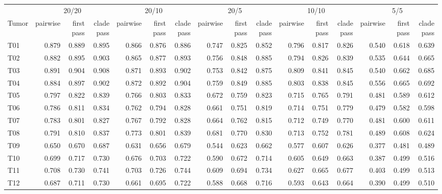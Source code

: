 \begin{tabular}{lrrrrrrrrrrrrrrr}
\toprule
 & \multicolumn{3}{c}{20/20} & \multicolumn{3}{c}{20/10} & \multicolumn{3}{c}{20/5} & \multicolumn{3}{c}{10/10} & \multicolumn{3}{c}{5/5} \\
\cmidrule(lr){2-4}\cmidrule(lr){5-7}\cmidrule(lr){8-10}\cmidrule(lr){11-13}\cmidrule(lr){14-16}
Tumor & pairwise & first pass & clade pass & pairwise & first pass & clade pass & pairwise & first pass & clade pass & pairwise & first pass & clade pass & pairwise & first pass & clade pass \\
\midrule
T01 & 0.879 & 0.889 & 0.895 & 0.866 & 0.876 & 0.886 & 0.747 & 0.825 & 0.852 & 0.796 & 0.817 & 0.826 & 0.540 & 0.618 & 0.639 \\
T02 & 0.882 & 0.895 & 0.903 & 0.865 & 0.877 & 0.893 & 0.756 & 0.848 & 0.885 & 0.794 & 0.826 & 0.839 & 0.535 & 0.644 & 0.665 \\
T03 & 0.891 & 0.904 & 0.908 & 0.871 & 0.893 & 0.902 & 0.753 & 0.842 & 0.875 & 0.809 & 0.841 & 0.845 & 0.540 & 0.662 & 0.685 \\
T04 & 0.884 & 0.897 & 0.902 & 0.872 & 0.892 & 0.904 & 0.759 & 0.849 & 0.885 & 0.803 & 0.838 & 0.845 & 0.556 & 0.665 & 0.692 \\
T05 & 0.797 & 0.822 & 0.839 & 0.766 & 0.803 & 0.833 & 0.672 & 0.759 & 0.823 & 0.715 & 0.765 & 0.791 & 0.481 & 0.589 & 0.612 \\
T06 & 0.786 & 0.811 & 0.834 & 0.762 & 0.794 & 0.828 & 0.661 & 0.751 & 0.819 & 0.714 & 0.751 & 0.779 & 0.479 & 0.582 & 0.598 \\
T07 & 0.783 & 0.801 & 0.827 & 0.767 & 0.792 & 0.828 & 0.664 & 0.762 & 0.815 & 0.712 & 0.749 & 0.770 & 0.481 & 0.600 & 0.611 \\
T08 & 0.791 & 0.810 & 0.837 & 0.773 & 0.801 & 0.839 & 0.681 & 0.770 & 0.830 & 0.713 & 0.752 & 0.781 & 0.489 & 0.608 & 0.624 \\
T09 & 0.650 & 0.670 & 0.687 & 0.631 & 0.656 & 0.679 & 0.544 & 0.623 & 0.662 & 0.577 & 0.607 & 0.626 & 0.377 & 0.481 & 0.489 \\
T10 & 0.699 & 0.717 & 0.730 & 0.676 & 0.703 & 0.722 & 0.590 & 0.672 & 0.714 & 0.605 & 0.649 & 0.663 & 0.387 & 0.499 & 0.516 \\
T11 & 0.708 & 0.730 & 0.741 & 0.703 & 0.726 & 0.744 & 0.609 & 0.694 & 0.734 & 0.627 & 0.665 & 0.677 & 0.403 & 0.499 & 0.513 \\
T12 & 0.687 & 0.711 & 0.730 & 0.661 & 0.695 & 0.722 & 0.588 & 0.668 & 0.716 & 0.593 & 0.643 & 0.664 & 0.390 & 0.499 & 0.510 \\

\end{tabular}
